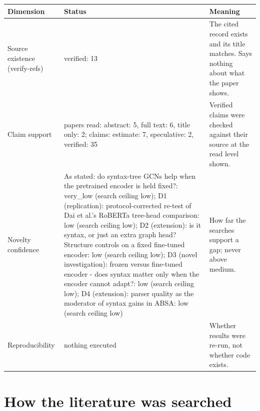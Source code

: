 \documentclass[11pt,a4paper]{article}
\begin{document}
{\small
\begin{longtable}{>{\raggedright\arraybackslash}p{}>{\raggedright\arraybackslash}p{}>{\raggedright\arraybackslash}p{}}
\toprule
\textbf{Dimension} & \textbf{Status} & \textbf{Meaning} \\
\midrule
\endhead
Source existence (verify-refs) & verified: 13 & The cited record exists and its title matches. Says nothing about what the paper shows. \\
Claim support & papers read: abstract: 5, full text: 6, title only: 2; claims: estimate: 7, speculative: 2, verified: 35 & Verified claims were checked against their source at the read level shown. \\
Novelty confidence & As stated: do syntax-tree GCNs help when the pretrained encoder is held fixed?: very\_low (search ceiling low); D1 (replication): protocol-corrected re-test of Dai et al.'s RoBERTa tree-head comparison: low (search ceiling low); D2 (extension): is it syntax, or just an extra graph head? Structure controls on a fixed fine-tuned encoder: low (search ceiling low); D3 (novel investigation): frozen versus fine-tuned encoder - does syntax matter only when the encoder cannot adapt?: low (search ceiling low); D4 (extension): parser quality as the moderator of syntax gains in ABSA: low (search ceiling low) & How far the searches support a gap; never above medium. \\
Reproducibility & nothing executed & Whether results were re-run, not whether code exists. \\
\bottomrule
\end{longtable}
}

\section{How the literature was searched}
\end{document}
